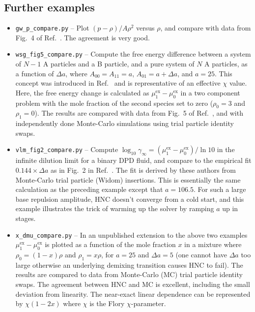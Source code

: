 \documentclass[12pt,a4paper]{article}
\newcommand{\myex}{^{\mathrm{ex}}}
\newcommand{\muex}{\mu\myex}
\newcommand{\Refcite}[1]{Ref.~\cite{#1}}
\begin{document}
\newpage

\subsection{Further examples}

\begin{itemize}
%
\item\verb+gw_p_compare.py+ -- Plot $(p-\rho) /A\rho^2$ versus $\rho$,
  and compare with data from Fig.~4 of \Refcite{GW97}.  The agreement
  is very good.
%
\item\verb+wsg_fig5_compare.py+ -- Compute the free energy difference
  between a system of $N-1$ A particles and a B particle, and a pure
  system of $N$ A particles, as a function of $\Delta a$, where
  $A_{00}=A_{11}=a$, $A_{01}=a+\Delta a$, and $a=25$.  This concept
  was introduced in \Refcite{WSG01} and is representative of an
  effective $\chi$ value.  Here, the free energy change is calculated
  as $\muex_1-\muex_0$ in a two component problem with the mole
  fraction of the second species set to zero ($\rho_0=3$ and
  $\rho_1=0$).  The results are compared with data from Fig.~5 of
  \Refcite{WSG01}, and with independently done Monte-Carlo simulations
  using trial particle identity swaps.
%
\item\verb+vlm_fig2_compare.py+ -- Compute $\log_{10}\gamma_\infty =
  (\muex_1 - \muex_0) / \ln 10$ in the infinite dilution limit for a
  binary DPD fluid, and compare to the empirical fit $0.144 \times
  \Delta a$ as in Fig.~2 in \Refcite{VLN13}.  The fit is derived by
  these authors from Monte-Carlo trial particle (Widom) insertions.
  This is essentially the same calculation as the preceding example
  except that $a=106.5$.  For such a large base repulsion amplitude,
  HNC doesn't converge from a cold start, and this example illustrates
  the trick of warming up the solver by ramping $a$ up in stages.
%
\item\verb+x_dmu_compare.py+ -- In an unpublished extension to the
  above two examples $\muex_1-\muex_0$ is plotted as a function of the
  mole fraction $x$ in a mixture where $\rho_0=(1-x)\rho$ and
  $\rho_1=x\rho$, for $a=25$ and $\Delta a=5$ (one cannot have $\Delta
  a$ too large otherwise an underlying demixing transition causes HNC
  to fail).  The results are compared to data from Monte-Carlo (MC)
  trial particle identity swaps.  The agreement between HNC
  and MC is excellent, including the small deviation from linearity.
  The near-exact linear dependence can be represented by $\chi (1 -
  2x)$ where $\chi$ is the Flory $\chi$-parameter.

\end{itemize}
\end{document}
